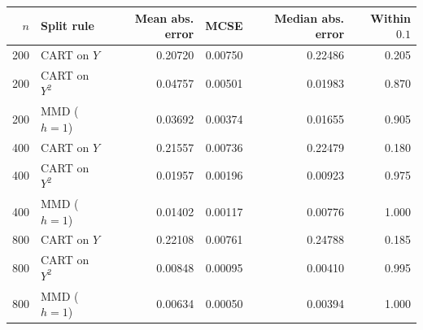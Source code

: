 \begin{tabular}{@{}rlrrrr@{}}
\toprule
$n$ & Split rule & Mean abs. error & MCSE & Median abs. error & Within $0.1$ \\
\midrule
200 & CART on $Y$ & 0.20720 & 0.00750 & 0.22486 & 0.205 \\
200 & CART on $Y^2$ & 0.04757 & 0.00501 & 0.01983 & 0.870 \\
200 & MMD ($h=1$) & 0.03692 & 0.00374 & 0.01655 & 0.905 \\
400 & CART on $Y$ & 0.21557 & 0.00736 & 0.22479 & 0.180 \\
400 & CART on $Y^2$ & 0.01957 & 0.00196 & 0.00923 & 0.975 \\
400 & MMD ($h=1$) & 0.01402 & 0.00117 & 0.00776 & 1.000 \\
800 & CART on $Y$ & 0.22108 & 0.00761 & 0.24788 & 0.185 \\
800 & CART on $Y^2$ & 0.00848 & 0.00095 & 0.00410 & 0.995 \\
800 & MMD ($h=1$) & 0.00634 & 0.00050 & 0.00394 & 1.000 \\
\bottomrule
\end{tabular}
